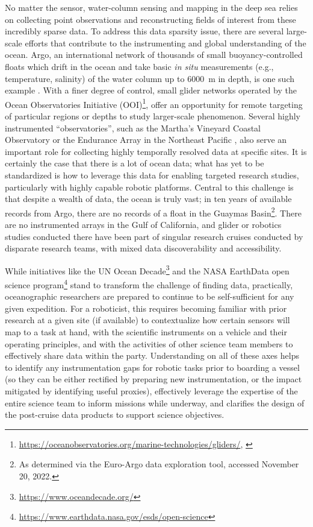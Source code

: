 No matter the sensor, water-column sensing and mapping in the deep sea relies on collecting point observations and reconstructing fields of interest from these incredibly sparse data.
To address this data sparsity issue, there are several large-scale efforts that contribute to the instrumenting and global understanding of the ocean. Argo, an international network of thousands of small buoyancy-controlled floats which drift in the ocean and take basic \emph{in situ} measurements (e.g., temperature, salinity) of the water column up to \SI{6000}{\meter} in depth, is one such example \autocite{roemmich2009argo,jayne2017argo}. With a finer degree of control, small glider networks operated by the Ocean Observatories Initiative (OOI)\footnote{\url{https://oceanobservatories.org/marine-technologies/gliders/}, \cite{trowbridge2019ocean}}, offer an opportunity for remote targeting of particular regions or depths to study larger-scale phenomenon. Several highly instrumented ``observatories'', such as the Martha's Vineyard Coastal Observatory \autocite{austin2000martha} or the Endurance Array in the Northeast Pacific \autocite{barth2018warm}, also serve an important role for collecting highly temporally resolved data at specific sites. It is certainly the case that there is a lot of ocean data; what has yet to be standardized is how to leverage this data for enabling targeted research studies, particularly with highly capable robotic platforms. Central to this challenge is that despite a wealth of data, the ocean is truly vast; in ten years of available records from Argo, there are no records of a float in the Guaymas Basin\footnote{As determined via the Euro-Argo data exploration tool, accessed November 20, 2022.}. There are no instrumented arrays in the Gulf of California, and glider or robotics studies conducted there have been part of singular research cruises conducted by disparate research teams, with mixed data discoverability and accessibility. 

While initiatives like the UN Ocean Decade\footnote{\url{https://www.oceandecade.org/}} and the NASA EarthData open science program\footnote{\url{https://www.earthdata.nasa.gov/esds/open-science}} stand to transform the challenge of finding data, practically, oceanographic researchers are prepared to continue to be self-sufficient for any given expedition.
For a roboticist, this requires becoming familiar with prior research at a given site (if available) to contextualize how certain sensors will map to a task at hand, with the scientific instruments on a vehicle and their operating principles, and with the activities of other science team members to effectively share data within the party. Understanding on all of these axes helps to identify any instrumentation gaps for robotic tasks prior to boarding a vessel (so they can be either rectified by preparing new instrumentation, or the impact mitigated by identifying useful proxies), effectively leverage the expertise of the entire science team to inform missions while underway, and clarifies the design of the post-cruise data products to support science objectives.

